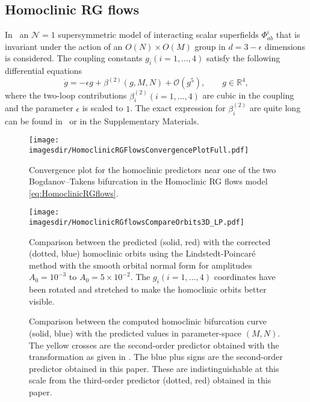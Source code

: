 \subsection{Homoclinic RG flows}
In~\cite{Jepsen2021HomoclinicRG}  an $\mathcal N = 1$ supersymmetric model of interacting
scalar superfields $\Phi_{ab}^i$ that is invariant under the action of an $O(N)
\times O(M)$ group in $d = 3 - \epsilon$ dimensions is considered.
The coupling constants $g_i(i=1,\dots,4)$ satisfy the following differential
equations
\begin{equation}
    \label{eq:HomoclinicRGflows} 
    \dot g = -\epsilon g + \beta^{(2)}(g,M,N) + \mathcal O(g^5),  \qquad g\in\mathbb R^4,
\end{equation} 
where the two-loop contributions $\beta_i^{(2)}(i=1,\dots,4)$ are cubic in the
coupling and the parameter $\epsilon$ is scaled to $1$.  The exact expression for
$\beta_i^{(2)}$ are quite long can be found in~\cite[Appendix B]{Jepsen2021HomoclinicRG}
or in the Supplementary Materials. 
\begin{figure}[b!]
    \texttt{[image: \\imagesdir/HomoclinicRGFlowsConvergencePlotFull.pdf]}
    \caption{Convergence plot for the homoclinic predictors near one of the
        two Bogdanov--Takens bifurcation in the Homoclinic RG flows model 
        \cref{eq:HomoclinicRGflows}.}
    \label{fig:HomoclinicRGFlowsConvergencePlot}
\end{figure}
%
\begin{figure}[t!]
    \texttt{[image: \\imagesdir/HomoclinicRGflowsCompareOrbits3D\_LP.pdf]}
    \caption{Comparison between the predicted (solid, red) with the corrected
        (dotted, blue) homoclinic orbits using the Lindstedt-Poincar\'e method
        with the smooth orbital normal form for amplitudes $A_0 = 10^{-3}$ to
        $A_0=5\times10^{-2}$. The $g_i(i=1,\dots,4)$ coordinates have been rotated and stretched
        to make the homoclinic orbits better visible.}
    \label{fig:HomoclinicRGFlows}
\end{figure}
%
\begin{figure}[t!]
\caption{Comparison between the computed homoclinic bifurcation curve
    (solid, blue) with the predicted values in parameter-space $(M,N)$.
    The yellow crosses are the second-order predictor obtained with the
    transformation as given in {\cite{Al-Hdaibat2016}}. The blue plus
    signs are the second-order predictor obtained in this paper. These are
    indistinguishable at this scale from the third-order
    predictor (dotted, red) obtained in this paper.}
\label{fig:HomoclinicRGFlowsParameters}
\end{figure}

